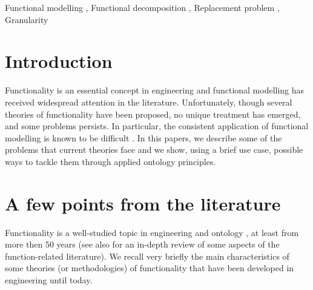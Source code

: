 \documentclass[
]{ceurart}
\begin{document}
\begin{keywords}
  Functional modelling \sep
  Functional decomposition \sep
  Replacement problem \sep
  Granularity
\end{keywords}

\maketitle


\section{Introduction}
    
Functionality is an essential concept in engineering and functional modelling has received widespread attention in the literature. 
Unfortunately, though several theories of functionality have been proposed, no unique treatment has emerged, and some problems persists. In particular, the consistent application of functional modelling is known to be difficult \cite{eckertThatWhichNot2013}.
In this papers, we describe some of the problems that current theories face and we show, using a brief use case, possible ways to tackle them through applied ontology principles. 

\section{A few points from the literature}\label{sec:literature}

Functionality is a well-studied topic in engineering \cite{chandrasekaranFunctionalRepresentationDesign1993, umedaFunctionBehaviourStructure1990, hirtz_functional_2002} and ontology \cite{sasajimaFBRLFunctionBehavior1995, TowardAUnifiedDefinition2012}, at least from more then 50 years \cite{collinsFailureExperienceMatrixUseful1976,pahl_engineering_2007} (see also \cite{erdenReviewFunctionModeling2008} for an in-depth review of some aspects of the function-related literature).
We recall very briefly the main characteristics of some theories (or methodologies) of functionality that have been developed in engineering until today.
\end{document}
